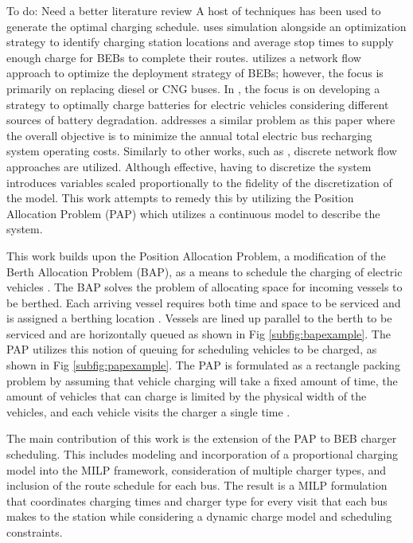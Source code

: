 \documentclass[utf8]{FrontiersinHarvard}
\newcommand{\TODO}[1]{{\color{green} To do: #1}}                                %
\begin{document}
\TODO{Need a better literature review} A host of techniques has been used to generate the optimal charging schedule.
\citep{Sebastiani2016} uses simulation alongside an optimization strategy to identify charging station locations and
average stop times to supply enough charge for BEBs to complete their routes. \citep{Wei2018} utilizes a network flow
approach to optimize the deployment strategy of BEBs; however, the focus is primarily on replacing diesel or CNG buses.
In \citep{Hoke2014}, the focus is on developing a strategy to optimally charge batteries for electric vehicles
considering different sources of battery degradation. \citep{Wang2017} addresses a similar problem as this paper where
the overall objective is to minimize the annual total electric bus recharging system operating costs. Similarly to other
works, such as \citep{Wei2018}, discrete network flow approaches are utilized. Although effective, having to discretize
the system introduces variables scaled proportionally to the fidelity of the discretization of the model. This work
attempts to remedy this by utilizing the Position Allocation Problem (PAP) which utilizes a continuous model to describe
the system.

This work builds upon the Position Allocation Problem, a modification of the Berth Allocation Problem (BAP), as a means
to schedule the charging of electric vehicles \citep{Qarebagh2019}. The BAP solves the problem of allocating space for
incoming vessels to be berthed. Each arriving vessel requires both time and space to be serviced and is assigned a
berthing location \citep{Imai2001}. Vessels are lined up parallel to the berth to be serviced and are horizontally
queued as shown in Fig \ref{subfig:bapexample}. The PAP utilizes this notion of queuing for scheduling vehicles to be
charged, as shown in Fig \ref{subfig:papexample}. The PAP is formulated as a rectangle packing problem by assuming that
vehicle charging will take a fixed amount of time, the amount of vehicles that can charge is limited by the physical
width of the vehicles, and each vehicle visits the charger a single time \citep{Qarebagh2019}.

The main contribution of this work is the extension of the PAP to BEB charger scheduling. This includes modeling and
incorporation of a proportional charging model into the MILP framework, consideration of multiple charger types, and
inclusion of the route schedule for each bus. The result is a MILP formulation that coordinates charging times and
charger type for every visit that each bus makes to the station while considering a dynamic charge model and scheduling
constraints.
\end{document}
